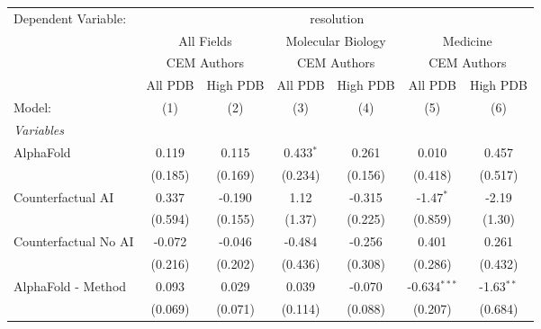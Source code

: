 \begingroup
\centering
\begin{tabular}{lcccccc}
   \tabularnewline \midrule \midrule
   Dependent Variable: & \multicolumn{6}{c}{resolution}\\
 & \multicolumn{2}{c}{All Fields} & \multicolumn{2}{c}{Molecular Biology} & \multicolumn{2}{c}{Medicine} \\
\cmidrule(lr){2-3} \cmidrule(lr){4-5} \cmidrule(lr){6-7}
 & \multicolumn{2}{c}{CEM Authors} & \multicolumn{2}{c}{CEM Authors} & \multicolumn{2}{c}{CEM Authors} \\
\cmidrule(lr){2-3} \cmidrule(lr){4-5} \cmidrule(lr){6-7}
 & \multicolumn{1}{c}{All PDB} & \multicolumn{1}{c}{High PDB} & \multicolumn{1}{c}{All PDB} & \multicolumn{1}{c}{High PDB} & \multicolumn{1}{c}{All PDB} & \multicolumn{1}{c}{High PDB} \\
\cmidrule(lr){2-2} \cmidrule(lr){3-3} \cmidrule(lr){4-4} \cmidrule(lr){5-5} \cmidrule(lr){6-6} \cmidrule(lr){7-7}
   Model:                                                     & (1)     & (2)     & (3)         & (4)           & (5)            & (6)\\  
   \midrule
   \emph{Variables}\\
   AlphaFold                                                  & 0.119   & 0.115   & 0.433$^{*}$ & 0.261         & 0.010          & 0.457\\   
                                                              & (0.185) & (0.169) & (0.234)     & (0.156)       & (0.418)        & (0.517)\\   
   Counterfactual AI                                          & 0.337   & -0.190  & 1.12        & -0.315        & -1.47$^{*}$    & -2.19\\   
                                                              & (0.594) & (0.155) & (1.37)      & (0.225)       & (0.859)        & (1.30)\\   
   Counterfactual No AI                                       & -0.072  & -0.046  & -0.484      & -0.256        & 0.401          & 0.261\\   
                                                              & (0.216) & (0.202) & (0.436)     & (0.308)       & (0.286)        & (0.432)\\   
   AlphaFold - Method                                         & 0.093   & 0.029   & 0.039       & -0.070        & -0.634$^{***}$ & -1.63$^{**}$\\   
                                                              & (0.069) & (0.071) & (0.114)     & (0.088)       & (0.207)        & (0.684)\\   

\end{tabular}
